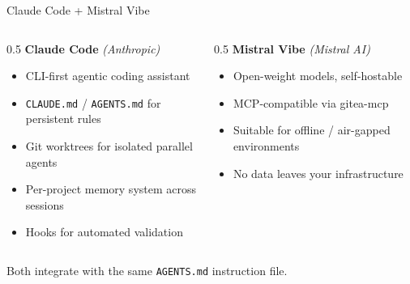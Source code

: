 \documentclass[
  ignorenonframetext,
  aspectratio=169,
]{beamer}
\providecommand{\tightlist}{%
  \setlength{\itemsep}{0pt}\setlength{\parskip}{0pt}}
\begin{document}
\begin{frame}[fragile]{Claude Code + Mistral Vibe}
\label{claude-code-mistral-vibe}
\begin{columns}[T]
\begin{column}{0.5\textwidth}
\textbf{Claude Code} \emph{(Anthropic)}

\begin{itemize}
\tightlist
\item
  CLI-first agentic coding assistant
\item
  \texttt{CLAUDE.md} / \texttt{AGENTS.md} for persistent rules
\item
  Git worktrees for isolated parallel agents
\item
  Per-project memory system across sessions
\item
  Hooks for automated validation
\end{itemize}
\end{column}

\begin{column}{0.5\textwidth}
\textbf{Mistral Vibe} \emph{(Mistral AI)}

\begin{itemize}
\tightlist
\item
  Open-weight models, self-hostable
\item
  MCP-compatible via gitea-mcp
\item
  Suitable for offline / air-gapped environments
\item
  No data leaves your infrastructure
\end{itemize}
\end{column}
\end{columns}

\vspace{0.3em}

Both integrate with the same \texttt{AGENTS.md} instruction file.
\end{frame}
\end{document}
